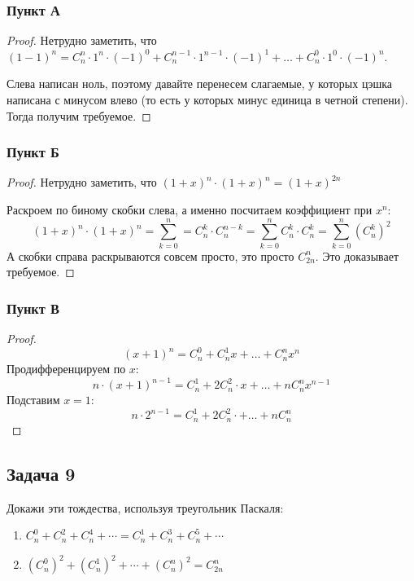 \subsubsection{Пункт А}

\begin{proof}
Нетрудно заметить, что $(1 - 1)^n = C^n_n\cdot 1^n \cdot (-1)^0 + C^{n-1}_n\cdot 1^{n-1} \cdot (-1)^1 + \ldots + C^{0}_n \cdot 1^0 \cdot (-1)^n$.

Слева написан ноль, поэтому давайте перенесем слагаемые, у которых цэшка написана с минусом влево (то есть у которых минус единица в четной степени). Тогда получим требуемое.
\end{proof}

\subsubsection{Пункт Б}
\begin{proof}
Нетрудно заметить, что $(1+x)^{n} \cdot (1+x)^{n} = (1 + x)^{2n}$

Раскроем по биному скобки слева, а именно посчитаем коэффициент при $x^n$:
\[(1+x)^{n} \cdot (1+x)^{n} = \sum_{k=0}^{n} = C^k_{n} \cdot C^{n-k}_{n} = \sum_{k=0}^{n} C^k_{n} \cdot C^{k}_{n} = \sum_{k=0}^{n} (C^k_{n})^2\]
А скобки справа раскрываются совсем просто, это просто $C^n_{2n}$. Это доказывает требуемое.
\end{proof}
\subsubsection{Пункт В}
\begin{proof}
\[
(x+1)^n = C^0_n + C^1_nx + \ldots + C^n_nx^n
\]
Продифференцируем по $x$:
\[
n \cdot (x + 1)^{n-1} = C^{1}_n + 2C^2_n\cdot x + \ldots + n C^n_n x^{n-1}
\]
Подставим $x = 1$:
\[
n \cdot 2^{n-1} = C^{1}_n + 2C^2_n\cdot + \ldots + n C^n_n
\]
\end{proof}
\subsection{Задача 9}
Докажи эти тождества, используя треугольник Паскаля:
\begin{enumerate}[label=\asbuk*)]
    \item $C_n^0 + C_n^2 + C_n^4 + \cdots = C_n^1 + C_n^3 + C_n^5 + \cdots$

    \item $(C_n^0)^2 + (C_n^1)^2 + \cdots + (C_n^n)^2 = C_{2n}^n$
\end{enumerate}
